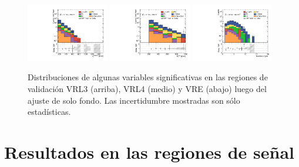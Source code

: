 \begin{figure}[ht!]
    \includegraphics[width=0.32\textwidth]{images/results/fr2_unblind/can_VRE_ph_pt0_afterFit.pdf}
    \includegraphics[width=0.32\textwidth]{images/results/fr2_unblind/can_VRE_met_et_afterFit.pdf}
    \includegraphics[width=0.32\textwidth]{images/results/fr2_unblind/can_VRE_jet_n_afterFit.pdf}

    
    \caption{Distribuciones de algunas variables significativas en las regiones de validación VRL3 (arriba), VRL4 (medio) y VRE (abajo) luego del ajuste de solo fondo. Las incertidumbre mostradas son sólo estadísticas.}
    \label{fig:dist_vrle_bkgonly}
\end{figure}






\section{Resultados en las regiones de señal}

